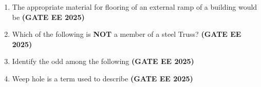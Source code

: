 \documentclass[journal,12pt,onecolumn]{IEEEtran}
\theoremstyle{remark}
\begin{document}
{\begin{enumerate}
\begin{enumerate}
\end{enumerate}
\item The appropriate material for flooring of an external ramp of a building would be \hfill \textbf{(GATE EE 2025)}
\begin{enumerate}
\end{enumerate}
\item Which of the following is \textbf{NOT} a member of a steel Truss? \hfill \textbf{(GATE EE 2025)}
\begin{enumerate}
\end{enumerate}
\item Identify the odd among the following \hfill \textbf{(GATE EE 2025)}
\begin{enumerate}
\end{enumerate}
\item Weep hole is a term used to describe \hfill \textbf{(GATE EE 2025)}
\begin{enumerate}

\end{enumerate}
\end{enumerate}}
\end{document}
